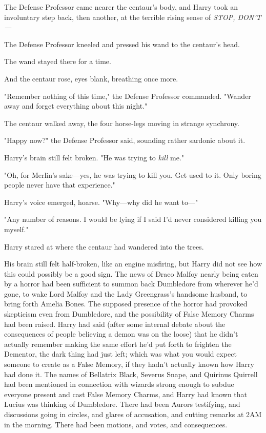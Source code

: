 The Defense Professor came nearer the centaur's body, and Harry took an 
involuntary step back, then another, at the terrible rising sense of 
\emph{STOP, DON'T---}

The Defense Professor kneeled and pressed his wand to the centaur's head.

The wand stayed there for a time.

And the centaur rose, eyes blank, breathing once more.

"Remember nothing of this time," the Defense Professor commanded. "Wander away 
and forget everything about this night."

The centaur walked away, the four horse-legs moving in strange synchrony.

"Happy now?" the Defense Professor said, sounding rather sardonic about it.

Harry's brain still felt broken. "He was trying to \emph{kill} me."

"Oh, for Merlin's sake---yes, he was trying to kill you. Get used to it. Only 
boring people never have that experience."

Harry's voice emerged, hoarse. "Why---why did he want to---"

"Any number of reasons. I would be lying if I said I'd never considered killing 
you myself."

Harry stared at where the centaur had wandered into the trees.

His brain still felt half-broken, like an engine misfiring, but Harry did not 
see how this could possibly be a good sign.
\sbreak
The news of Draco Malfoy nearly being eaten by a horror had been sufficient to 
summon back Dumbledore from wherever he'd gone, to wake Lord Malfoy and the 
Lady Greengrass's handsome husband, to bring forth Amelia Bones. The supposed 
presence of the horror had provoked skepticism even from Dumbledore, and the 
possibility of False Memory Charms had been raised. Harry had said (after some 
internal debate about the consequences of people believing a demon was on the 
loose) that he didn't actually remember making the same effort he'd put forth 
to frighten the Dementor, the dark thing had just left; which was what you 
would expect someone to create as a False Memory, if they hadn't actually known 
how Harry had done it. The names of Bellatrix Black, Severus Snape, and 
Quirinus Quirrell had been mentioned in connection with wizards strong enough 
to subdue everyone present and cast False Memory Charms, and Harry had known 
that Lucius was thinking of Dumbledore. There had been Aurors testifying, and 
discussions going in circles, and glares of accusation, and cutting remarks at 
2AM in the morning. There had been motions, and votes, and consequences.

